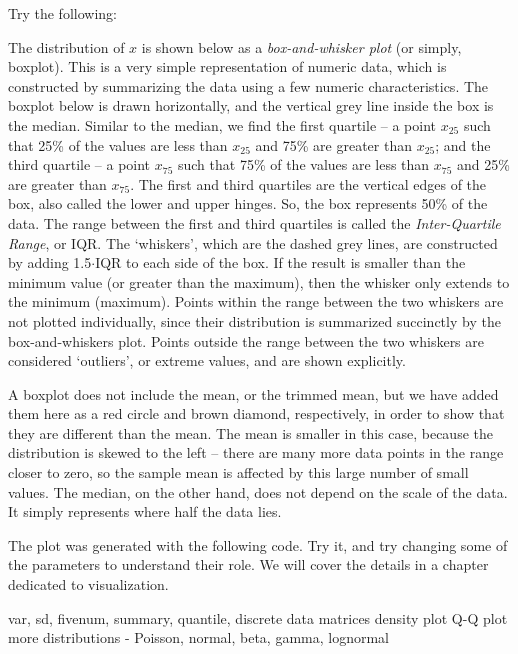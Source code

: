 Try the following:


The distribution of $x$ is shown below as a \textit{box-and-whisker plot} (or simply, boxplot). This is a very simple representation of numeric data, which is constructed by summarizing the data using a few numeric characteristics. The boxplot below is drawn horizontally, and the vertical grey line inside the box is the median. Similar to the median, we find the first quartile -- a point $x_{25}$ such that 25\% of the values are less than $x_{25}$ and 75\% are greater than $x_{25}$; and the third quartile -- a point $x_{75}$ such that 75\% of the values are less than $x_{75}$ and 25\% are greater than $x_{75}$. The first and third quartiles are the vertical edges of the box, also called the lower and upper hinges. So, the box represents 50\% of the data. The range between the first and third quartiles is called the \textit{Inter-Quartile Range}, or IQR.
The `whiskers', which are the dashed grey lines, are constructed by adding 1.5$\cdot$IQR to each side of the box. If the result is smaller than the minimum value (or greater than the maximum), then the whisker only extends to the minimum (maximum). Points within the range between the two whiskers are not plotted individually, since their distribution is summarized succinctly by the box-and-whiskers plot. Points outside the range between the two whiskers are considered `outliers', or extreme values, and are shown explicitly. 


A boxplot does not include the mean, or the trimmed mean, but we have added them here as a red circle and brown diamond, respectively, in order to show that they are different than the mean. The mean is smaller in this case, because the distribution is skewed to the left -- there are many more data points in the range closer to zero, so the sample mean is affected by this large number of small values. The median, on the other hand, does not depend on the scale of the data. It simply represents where half the data lies. 

The plot was generated with the following code. Try it, and try changing some of the parameters to understand their role. We will cover the details in a chapter dedicated to visualization.



var, sd, fivenum, summary, quantile, 
discrete data
matrices
density plot
Q-Q plot
more distributions - Poisson, normal, beta, gamma, lognormal
